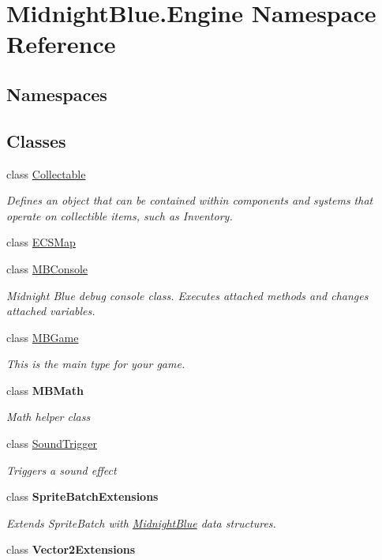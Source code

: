 \hypertarget{namespace_midnight_blue_1_1_engine}{}\section{Midnight\+Blue.\+Engine Namespace Reference}
\label{namespace_midnight_blue_1_1_engine}
\subsection*{Namespaces}
\begin{DoxyCompactItemize}
\end{DoxyCompactItemize}
\subsection*{Classes}
\begin{DoxyCompactItemize}
\item 
class \hyperlink{class_midnight_blue_1_1_engine_1_1_collectable}{Collectable}
\begin{DoxyCompactList}\small\item\em Defines an object that can be contained within components and systems that operate on collectible items, such as Inventory. \end{DoxyCompactList}\item 
class \hyperlink{class_midnight_blue_1_1_engine_1_1_e_c_s_map}{E\+C\+S\+Map}
\item 
class \hyperlink{class_midnight_blue_1_1_engine_1_1_m_b_console}{M\+B\+Console}
\begin{DoxyCompactList}\small\item\em Midnight Blue debug console class. Executes attached methods and changes attached variables. \end{DoxyCompactList}\item 
class \hyperlink{class_midnight_blue_1_1_engine_1_1_m_b_game}{M\+B\+Game}
\begin{DoxyCompactList}\small\item\em This is the main type for your game. \end{DoxyCompactList}\item 
class {\bfseries M\+B\+Math}
\begin{DoxyCompactList}\small\item\em Math helper class \end{DoxyCompactList}\item 
class \hyperlink{class_midnight_blue_1_1_engine_1_1_sound_trigger}{Sound\+Trigger}
\begin{DoxyCompactList}\small\item\em Triggers a sound effect \end{DoxyCompactList}\item 
class {\bfseries Sprite\+Batch\+Extensions}
\begin{DoxyCompactList}\small\item\em Extends Sprite\+Batch with \hyperlink{namespace_midnight_blue}{Midnight\+Blue} data structures. \end{DoxyCompactList}\item 
class {\bfseries Vector2\+Extensions}
\end{DoxyCompactItemize}
